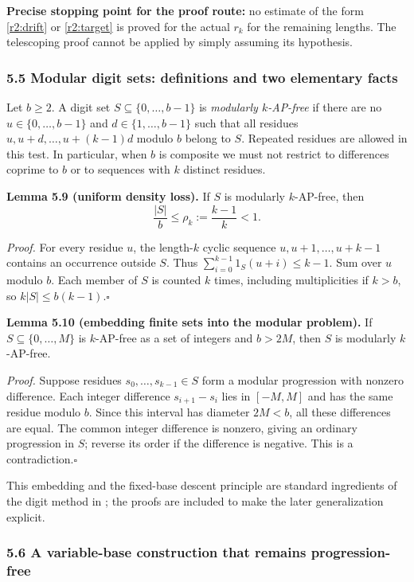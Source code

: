\textbf{Precise stopping point for the proof route:} no estimate of the form \eqref{r2:drift} or \eqref{r2:target} is proved for the actual $r_k$ for the remaining lengths. The telescoping proof cannot be applied by simply assuming its hypothesis.

\subsubsection{5.5 Modular digit sets: definitions and two elementary facts}

Let $b\ge2$. A digit set $S\subseteq\{0,\ldots,b-1\}$ is \emph{modularly $k$-AP-free} if there are no $u\in\{0,\ldots,b-1\}$ and $d\in\{1,\ldots,b-1\}$ such that all residues $u,u+d,\ldots,u+(k-1)d$ modulo $b$ belong to $S$. Repeated residues are allowed in this test. In particular, when $b$ is composite we must not restrict to differences coprime to $b$ or to sequences with $k$ distinct residues.

\noindent\textbf{Lemma 5.9 (uniform density loss).}
If $S$ is modularly $k$-AP-free, then
\[
\frac{|S|}{b}\le\rho_k:=\frac{k-1}{k}<1.
\]

\noindent\emph{Proof.}
For every residue $u$, the length-$k$ cyclic sequence $u,u+1,\ldots,u+k-1$ contains an occurrence outside $S$. Thus $\sum_{i=0}^{k-1}1_S(u+i)\le k-1$. Sum over $u$ modulo $b$. Each member of $S$ is counted $k$ times, including multiplicities if $k>b$, so $k|S|\le b(k-1)$.\hfill$\square$

\medskip
\noindent\textbf{Lemma 5.10 (embedding finite sets into the modular problem).}
If $S\subseteq\{0,\ldots,M\}$ is $k$-AP-free as a set of integers and $b>2M$, then $S$ is modularly $k$-AP-free.

\noindent\emph{Proof.}
Suppose residues $s_0,\ldots,s_{k-1}\in S$ form a modular progression with nonzero difference. Each integer difference $s_{i+1}-s_i$ lies in $[-M,M]$ and has the same residue modulo $b$. Since this interval has diameter $2M<b$, all these differences are equal. The common integer difference is nonzero, giving an ordinary progression in $S$; reverse its order if the difference is negative. This is a contradiction.\hfill$\square$

This embedding and the fixed-base descent principle are standard ingredients of the digit method in \cite{walker}; the proofs are included to make the later generalization explicit.

\subsubsection{5.6 A variable-base construction that remains progression-free}

